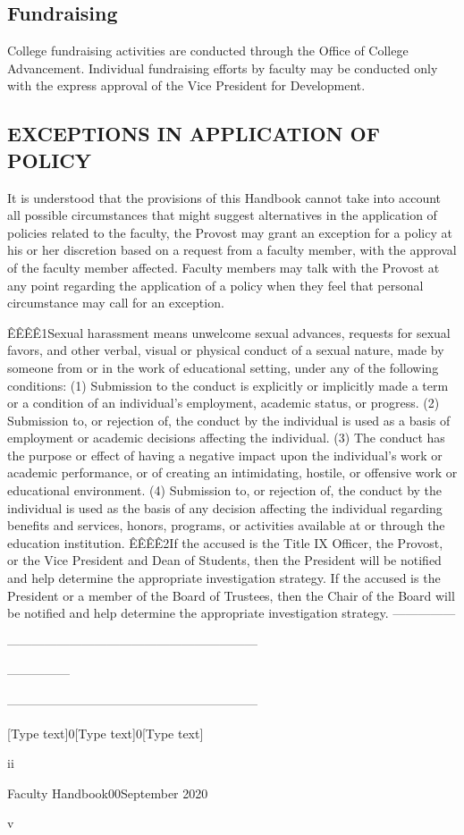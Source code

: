 \documentclass[letterpaper, 11pt]{article}
\begin{document}
	\subsection{Fundraising}
		College fundraising activities are conducted through the Office of College Advancement.  Individual fundraising efforts by faculty may be conducted only with the express approval of the Vice President for Development.

	\subsection{EXCEPTIONS IN APPLICATION OF POLICY}
		It is understood that the provisions of this Handbook cannot take into account all possible circumstances that might suggest alternatives in the application of policies related to the faculty, the Provost may grant an exception for a policy at his or her discretion based on a request from a faculty member, with the approval of the faculty member affected.  Faculty members may talk with the Provost at any point regarding the application of a policy when they feel that personal circumstance may call for an exception.





		ÊÊÊÊ1Sexual harassment means unwelcome sexual advances, requests for sexual favors, and other verbal, visual or physical conduct of a sexual nature, made by someone from or in the work of educational setting, under any of the following conditions:
		(1)  Submission to the conduct is explicitly or implicitly made a term or a condition of an individual's employment, academic status, or progress.
		(2)  Submission to, or rejection of, the conduct by the individual is used as a basis of employment or academic decisions affecting the individual.
		(3)  The conduct has the purpose or effect of having a negative impact upon the individual's work or academic performance, or of creating an intimidating, hostile, or offensive work or educational environment.
		(4)  Submission to, or rejection of, the conduct by the individual is used as the basis of any decision affecting the individual regarding benefits and services, honors, programs, or activities available at or through the education institution.
		ÊÊÊÊ2If the accused is the Title IX Officer, the Provost, or the Vice President and Dean of Students, then the President will be notified and help determine the appropriate investigation strategy.  If the accused is the President or a member of the Board of Trustees, then the Chair of the Board will be notified and help determine the appropriate investigation strategy.
		---------------

		------------------------------------------------------------

		---------------

		------------------------------------------------------------

		[Type text]0[Type text]0[Type text]







		ii


		Faculty Handbook00September 2020

		v




		
		
\end{document}
